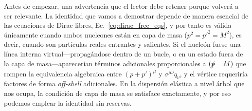 \documentclass[10pt,a4paper]{article}
\begin{document}
Antes de empezar, una advertencia que el lector debe retener porque volverá a ser relevante. La identidad que vamos a demostrar depende de manera esencial de las ecuaciones de Dirac libres, Ec.~\eqref{eq:dirac_free_eqs}, y por tanto es válida únicamente cuando ambos nucleones están en capa de masa ($p^2 = p'^2 = M^2$), es decir, cuando son partículas reales entrantes y salientes. Si el nucleón fuese una línea interna virtual---propagándose dentro de un bucle, o en un estado fuera de la capa de masa---aparecerían términos adicionales proporcionales a $(\slashed{p} - M)$ que rompen la equivalencia algebraica entre $(p+p')^\mu$ y $\sigma^{\mu\nu}q_\nu$, y el vértice requeriría factores de forma \emph{off-shell} adicionales. En la dispersión elástica a nivel árbol que nos ocupa, la condición de capa de masa se satisface exactamente, y por eso podemos emplear la identidad sin reservas.
\end{document}
